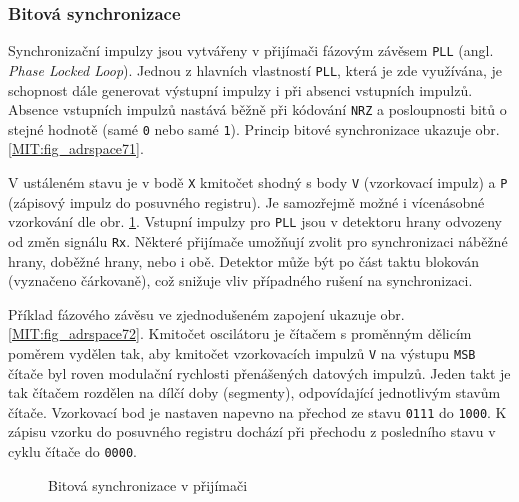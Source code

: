       \subsubsection{Bitová synchronizace}
        Synchronizační impulzy jsou vytvářeny v přijímači fázovým závěsem \texttt{PLL} (angl. 
        \emph{Phase Locked Loop}). Jednou z hlavních vlastností \texttt{PLL}, která je zde 
        využívána, je schopnost dále generovat výstupní impulzy i při absenci vstupních impulzů. 
        Absence vstupních impulzů nastává běžně při kódování \texttt{NRZ} a posloupnosti bitů o 
        stejné hodnotě (samé \texttt{0} nebo samé \texttt{1}). Princip bitové synchronizace ukazuje 
        obr. \ref{MIT:fig_adrspace71}.
        
        V ustáleném stavu je v bodě \texttt{X} kmitočet shodný s body \texttt{V} (vzorkovací impulz)
        a \texttt{P} (zápisový impulz do posuvného registru). Je samozřejmě možné i vícenásobné
        vzorkování dle obr. \ref{MIT:fig_sbernice7172}. Vstupní impulzy pro \texttt{PLL} jsou v
        detektoru hrany odvozeny od změn signálu \texttt{Rx}. Některé přijímače umožňují zvolit pro
        synchronizaci náběžné hrany, doběžné hrany, nebo i obě. Detektor může být po část taktu
        blokován (vyznačeno čárkovaně), což snižuje vliv případného rušení na synchronizaci.
        
        Příklad fázového závěsu ve zjednodušeném zapojení ukazuje obr. \ref{MIT:fig_adrspace72}.
        Kmitočet oscilátoru je čítačem s proměnným dělicím poměrem vydělen tak, aby kmitočet
        vzorkovacích impulzů \texttt{V} na výstupu \texttt{MSB} čítače byl roven modulační rychlosti
        přenášených datových impulzů. Jeden takt je tak čítačem rozdělen na dílčí doby (segmenty),
        odpovídající jednotlivým stavům čítače. Vzorkovací bod je nastaven napevno na přechod ze
        stavu \texttt{0111} do \texttt{1000}. K zápisu vzorku do posuvného registru dochází při
        přechodu z posledního stavu v cyklu čítače do \texttt{0000}.
        
        \begin{figure}[ht!]
          \centering  
          \caption{Bitová synchronizace v přijímači}
          \label{MIT:fig_sbernice7172}
        \end{figure}
        
